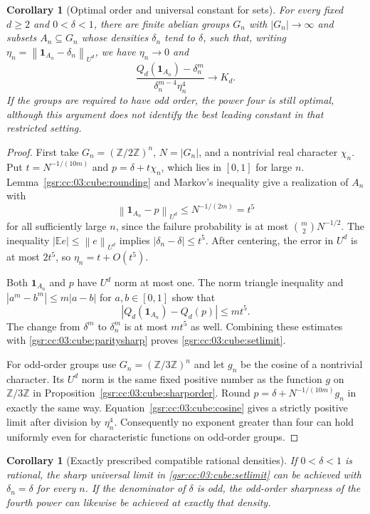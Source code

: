 \documentclass[11pt,letterpaper]{article}
\numberwithin{equation}{section}
\newtheorem{corollary}[theorem]{Corollary}
\theoremstyle{definition}
\theoremstyle{remark}
\newcommand{\E}{\mathbb E}
\newcommand{\Z}{\mathbb Z}
\newcommand{\1}{\mathbf 1}
\newcommand{\norm}[1]{\left\|#1\right\|}
\begin{document}
\begin{corollary}[Optimal order and universal constant for sets]
\label{gsr:cc:03:cube:setsharpness}
For every fixed $d\geq2$ and $0<\delta<1$, there are finite abelian
groups $G_n$ with $|G_n|\to\infty$ and subsets $A_n\subseteq G_n$
whose densities $\delta_n$ tend to $\delta$, such that, writing
$\eta_n=\norm{\1_{A_n}-\delta_n}_{U^d}$, we have $\eta_n\to0$ and
\begin{equation}
 \frac{Q_d(\1_{A_n})-\delta_n^m}
      {\delta_n^{m-4}\eta_n^4}\longrightarrow K_d.
 \label{gsr:cc:03:cube:setlimit}
\end{equation}
If the groups are required to have odd order, the power four is still
optimal, although this argument does not identify the best leading
constant in that restricted setting.
\end{corollary}

\begin{proof}
First take $G_n=(\Z/2\Z)^n$, $N=|G_n|$, and a nontrivial real
character $\chi_n$.  Put $t=N^{-1/(10m)}$ and
$p=\delta+t\chi_n$, which lies in $[0,1]$ for large $n$.
Lemma~\ref{gsr:cc:03:cube:rounding} and Markov's inequality give a realization
of $A_n$ with
\[
 \norm{\1_{A_n}-p}_{U^d}\leq N^{-1/(2m)}=t^5
\]
for all sufficiently large $n$, since the failure probability is at
most $\binom m2N^{-1/2}$.
The inequality $|\E e|\leq\norm e_{U^d}$ implies
$|\delta_n-\delta|\leq t^5$.
After centering, the error in $U^d$ is at most $2t^5$, so
$\eta_n=t+O(t^5)$.

Both $\1_{A_n}$ and $p$ have $U^d$ norm at most one.  The norm triangle
inequality and $|a^m-b^m|\leq m|a-b|$ for $a,b\in[0,1]$ show that
\[
 |Q_d(\1_{A_n})-Q_d(p)|\leq m t^5.
\]
The change from $\delta^m$ to $\delta_n^m$ is at most $mt^5$ as well.
Combining these estimates with \eqref{gsr:cc:03:cube:paritysharp} proves
\eqref{gsr:cc:03:cube:setlimit}.

For odd-order groups use $G_n=(\Z/3\Z)^n$ and let $g_n$ be the cosine
of a nontrivial character.  Its $U^d$ norm is the same fixed positive
number as the function $g$ on $\Z/3\Z$ in
Proposition~\ref{gsr:cc:03:cube:sharporder}.  Round
$p=\delta+N^{-1/(10m)}g_n$ in exactly the same way.
Equation~\eqref{gsr:cc:03:cube:cosine} gives a strictly positive limit after
division by $\eta_n^4$.  Consequently no exponent greater than four
can hold uniformly even for characteristic functions on odd-order
groups.
\end{proof}

\begin{corollary}[Exactly prescribed compatible rational densities]
\label{gsr:cc:03:cube:exactdensity}
If $0<\delta<1$ is rational, the sharp universal limit in
\eqref{gsr:cc:03:cube:setlimit} can be achieved with $\delta_n=\delta$ for every
$n$. If the denominator of $\delta$ is odd, the odd-order sharpness
of the fourth power can likewise be achieved at exactly that density.
\end{corollary}
\end{document}
